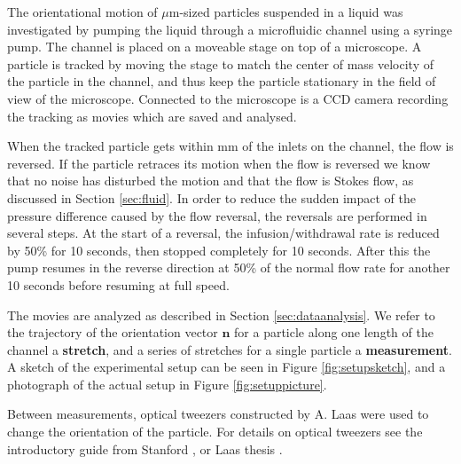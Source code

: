 \label{sec:exp_setup}
The orientational motion of $\mu$m-sized particles suspended in a liquid was investigated by pumping the liquid through a microfluidic channel using a syringe pump. 
The channel is placed on a moveable stage on top of a microscope. A particle is tracked by moving the stage to match the center of mass velocity of the particle in the channel, and thus keep the particle stationary in the field of view of the microscope. Connected to the microscope is a CCD camera recording the tracking as movies which are saved and analysed.

When the tracked particle gets within \unit[10]{mm} of the inlets on the channel, the flow is reversed. If the particle retraces its motion when the flow is reversed we know that no noise has disturbed the motion and that the flow is Stokes flow, as discussed in Section \ref{sec:fluid}. In order to reduce the sudden impact of the pressure difference caused by the flow reversal, the reversals are performed in several steps. At the start of a reversal, the infusion/withdrawal rate is reduced by 50\% for 10 seconds, then stopped completely for 10 seconds. After this the pump resumes in the reverse direction at 50\% of the normal flow rate for another 10 seconds before resuming at full speed. 

The movies are analyzed as described in Section \ref{sec:dataanalysis}. We refer to the trajectory of the orientation vector $\mathbf{n}$ for a particle along one length of the channel a \textbf{stretch}, and a series of stretches for a single particle a \textbf{measurement}. A sketch of the experimental setup can be seen in Figure \ref{fig:setupsketch}, and a photograph of the actual setup in Figure \ref{fig:setuppicture}. 

Between measurements, optical tweezers constructed by A. Laas were used to change the orientation of the particle. For details on optical tweezers see the introductory guide from Stanford \cite{OpticalTweezer}, or Laas thesis \cite{alexanderThesis}. 


